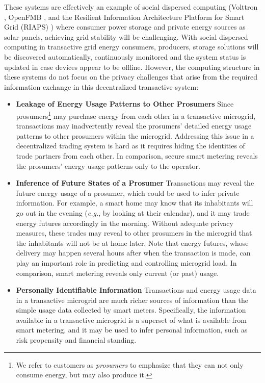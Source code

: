 \documentclass[12pt,letterpaper]{article}
\begin{document}
These systems are effectively an example of social dispersed computing (Volttron \cite{katipamula2016volttron}, OpenFMB
\cite{gunthersmart}, and the Resilient Information Architecture
Platform for Smart Grid (RIAPS)
\cite{eisele2017riaps,Scott2017ICCPS}) where consumer power storage and private energy sources as solar panels, achieving grid stability will be challenging.  With social dispersed computing in transactive grid energy consumers, producers, storage solutions will be discovered automatically, continuously monitored and the system status is updated in case devices appear to be offline. However, the computing structure in these systems do not focus on the  privacy challenges that arise from the
required information exchange in this decentralized transactive
system: 
\begin{itemize}[itemsep=0.1\parskip,topsep=-0.75\parskip]
\item \textbf{Leakage of Energy Usage Patterns to Other Prosumers} 
 Since prosumers\footnote{We
  refer to customers as \emph{prosumers} to emphasize that they can
  not only consume energy, but may also produce it.} may purchase
  energy from each other in a transactive microgrid, transactions may
  inadvertently reveal the prosumers' detailed energy usage patterns
  to other prosumers within the microgrid.  Addressing this issue in a
  decentralized trading system is hard as it requires hiding the
  identities of trade partners from each other. In comparison, secure
  smart metering reveals the prosumers' energy usage patterns only to
  the operator.

\item \textbf{Inference of Future States of a Prosumer} 
  Transactions may reveal
  the future energy usage of a prosumer, which could be used to infer
  private information.  For example, a smart home may know that its
  inhabitants will go out in the evening (\emph{e.g.}, by looking at
  their calendar), and it may trade energy futures accordingly in the
  morning.  Without adequate privacy measures, these trades may reveal
  to other prosumers in the microgrid that the inhabitants will not be
  at home later.  Note that energy
  futures, whose delivery may happen several hours after when the
  transaction is made, can play an important role in predicting and
  controlling microgrid load.  In comparison, smart metering reveals
  only current (or past) usage.

\item \textbf{Personally Identifiable Information} 
  Transactions and energy
  usage data in a transactive microgrid are much richer sources of
  information than the simple usage data collected by smart
  meters.  Specifically, the information available in a
  transactive microgrid is a superset of what is available from smart
  metering, and it may be used to infer personal information, such as
  risk propensity and financial standing.
\end{itemize}
\vspace{0.5\parskip}
\end{document}
